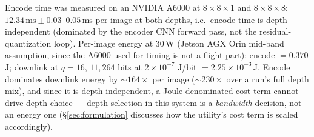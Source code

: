 Encode time was measured on an NVIDIA A6000 at $8{\times}8{\times}1$ and
$8{\times}8{\times}8$: $12.34\,\text{ms} \pm 0.03$--$0.05\,\text{ms}$ per
image at both depths, i.e.\ encode time is depth-independent (dominated by
the encoder CNN forward pass, not the residual-quantization loop). Per-image
energy at 30\,W (Jetson AGX Orin mid-band assumption, since the A6000 used
for timing is not a flight part): encode $= 0.370$\,J; downlink at $q=16$,
$11{,}264$ bits at $2\times10^{-7}$ J/bit $= 2.25\times10^{-3}$\,J. Encode
dominates downlink energy by $\sim 164\times$ per image ($\sim 230\times$
over a run's full depth mix), and since it is depth-independent, a
Joule-denominated cost term cannot drive depth choice — depth selection in
this system is a \emph{bandwidth} decision, not an energy one
(\S\ref{sec:formulation} discusses how the utility's cost term is scaled
accordingly).

